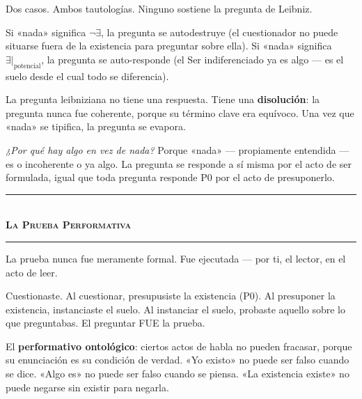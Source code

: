 \documentclass[10pt, openany, oneside]{book}
\renewcommand{\normalsize}{\fontsize{10}{13}\selectfont}
\begin{document}
\vspace{0.8em}

\noindent Dos casos. Ambos tautologías. Ninguno sostiene la pregunta de Leibniz.

Si «nada» significa $\neg\exists$, la pregunta se autodestruye (el cuestionador no puede situarse fuera de la existencia para preguntar sobre ella). Si «nada» significa $\exists|_{\text{potencial}}$, la pregunta se auto-responde (el Ser indiferenciado ya es algo --- es el suelo desde el cual todo se diferencia).

La pregunta leibniziana no tiene una respuesta. Tiene una \textbf{disolución}: la pregunta nunca fue coherente, porque su término clave era equívoco. Una vez que «nada» se tipifica, la pregunta se evapora.

\textit{¿Por qué hay algo en vez de nada?} Porque «nada» --- propiamente entendida --- es o incoherente o ya algo. La pregunta se responde a sí misma por el acto de ser formulada, igual que toda pregunta responde P0 por el acto de presuponerlo.

\vspace{1.5em}


\begin{center}
    \rule{0.3\textwidth}{0.4pt}\\[0.5em]
    {\normalsize\bfseries\scshape La Prueba Performativa}\\[0.3em]
    \rule{0.3\textwidth}{0.4pt}
\end{center}

\vspace{1em}

\noindent La prueba nunca fue meramente formal. Fue ejecutada --- por ti, el lector, en el acto de leer.

Cuestionaste. Al cuestionar, presupusiste la existencia (P0). Al presuponer la existencia, instanciaste el suelo. Al instanciar el suelo, probaste aquello sobre lo que preguntabas. El preguntar FUE la prueba.

El \textbf{performativo ontológico}: ciertos actos de habla no pueden fracasar, porque su enunciación es su condición de verdad. «Yo existo» no puede ser falso cuando se dice. «Algo es» no puede ser falso cuando se piensa. «La existencia existe» no puede negarse sin existir para negarla.

\vspace{0.5em}
\end{document}
